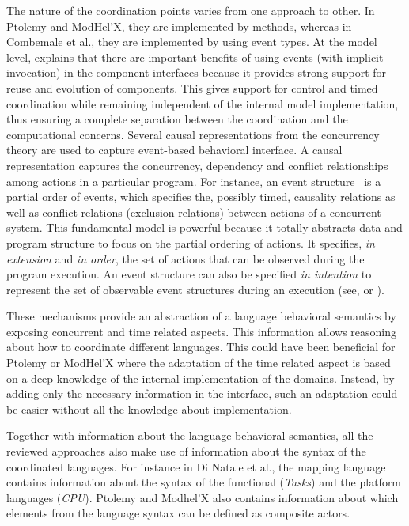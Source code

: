 {The nature of the coordination points varies from one approach to other. In Ptolemy and ModHel'X, they are implemented by methods, whereas in Combemale et al., they are implemented by using event types. At the model level, \cite{garlansoftarchbib} explains that there are important benefits of using events (with implicit invocation) in the component interfaces because it provides strong support for reuse and evolution of components. This gives support for control and timed coordination while remaining independent of the internal model implementation, thus ensuring a complete separation between the coordination and the computational concerns. Several causal representations from the concurrency theory are used to capture event-based behavioral interface. A causal representation captures the concurrency, dependency and conflict relationships among actions in a particular program. For instance, an event structure~\cite{eventStructures} is a partial order of events, which specifies the, possibly timed, causality relations as well as conflict relations (\ie exclusion relations) between actions of a concurrent system. This fundamental model is powerful because it totally abstracts data and program structure to focus on the partial ordering of actions. It specifies, \emph{in extension} and \emph{in order}, the set of actions that can be observed during the program execution. An event structure can also be specified \emph{in intention} to represent the set of observable event structures during an execution (see, \eg\cite{ccslbib} or \cite{tagmachinebib}). 

These mechanisms provide an abstraction of a language behavioral semantics by exposing concurrent and time related aspects. This information allows reasoning about how to coordinate different languages. This could have been beneficial for Ptolemy or ModHel'X where the adaptation of the time related aspect is based on a deep knowledge of the internal implementation of the domains. Instead, by adding only the necessary information in the interface, such an adaptation could be easier without all the knowledge about implementation. 

Together with information about the language behavioral semantics, all the reviewed approaches also make use of information about the syntax of the coordinated languages. For instance in Di Natale et al., the mapping language contains information about the syntax of the functional (\eg \emph{Tasks}) and the platform languages (\eg \emph{CPU}). Ptolemy and Modhel'X also contains information about which elements from the language syntax can be defined as composite actors.

}
